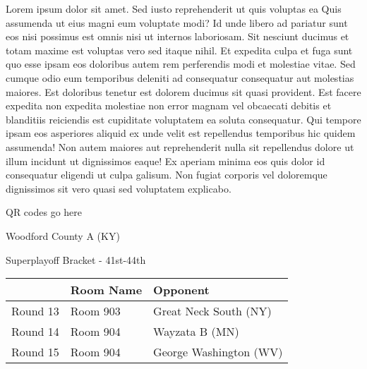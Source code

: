 \documentclass{article}%
\begin{document}
\vspace*{8pt}%
\linebreak%
\newline%
\newline%
Lorem ipsum dolor sit amet. Sed iusto reprehenderit ut quis voluptas ea Quis assumenda ut eius magni eum voluptate modi? Id unde libero ad pariatur sunt eos nisi possimus est omnis nisi ut internos laboriosam. Sit nesciunt ducimus et totam maxime est voluptas vero sed itaque nihil. Et expedita culpa et fuga sunt quo esse ipsam eos doloribus autem rem perferendis modi et molestiae vitae.\newline%
\newline%
Sed cumque odio eum temporibus deleniti ad consequatur consequatur aut molestias maiores. Est doloribus tenetur est dolorem ducimus sit quasi provident. Est facere expedita non expedita molestiae non error magnam vel obcaecati debitis et blanditiis reiciendis est cupiditate voluptatem ea soluta consequatur. Qui tempore ipsam eos asperiores aliquid ex unde velit est repellendus temporibus hic quidem assumenda!\newline%
\newline%
Non autem maiores aut reprehenderit nulla sit repellendus dolore ut illum incidunt ut dignissimos eaque! Ex aperiam minima eos quis dolor id consequatur eligendi ut culpa galisum. Non fugiat corporis vel doloremque dignissimos sit vero quasi sed voluptatem explicabo.\newline%
\newline%
%
\vspace*{30pt}%
\begin{center}%
\begin{Huge}%
QR codes go here%
\end{Huge}%
\end{center}%
\newpage%
\begin{center}%
\begin{Huge}%
Woodford County A (KY)%
\end{Huge}%
\vspace*{8pt}%
\linebreak%
\begin{Large}%
Superplayoff Bracket {-} 41st{-}44th%
\end{Large}%
\end{center}%
%
\begin{tabularx}{\textwidth}{|c|Y|Y|}%
\hline%
&Room Name&Opponent\\%
\hline%
Round 13&Room 903&Great Neck South (NY)\\%
Round 14&Room 904&Wayzata B (MN)\\%
Round 15&Room 904&George Washington (WV)\\%
\hline%
\end{tabularx}%
\end{document}
